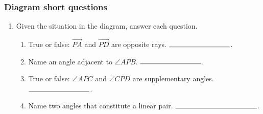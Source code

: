 \documentclass[12pt, twoside]{article}
\begin{document}
\subsubsection*{Diagram short questions}
  \begin{enumerate}
    \item Given the situation in the diagram, answer each question. \vspace{1cm}
      \begin{flushright}
      \end{flushright}
    \begin{enumerate}
      \item True or false: $\overrightarrow{PA}$ and $\overrightarrow{PD}$ are opposite rays. $\rule{3cm}{0.15mm}$. \bigskip
      \item Name an angle adjacent to $\angle APB$. $\rule{3cm}{0.15mm}$. \bigskip
      \item True or false: $\angle APC$ and $\angle CPD$ are supplementary angles. $\rule{3cm}{0.15mm}$. \bigskip
      \item Name two angles that constitute a linear pair. $\rule{4cm}{0.15mm}$. \bigskip
    \end{enumerate}


\end{enumerate}
\end{document}
